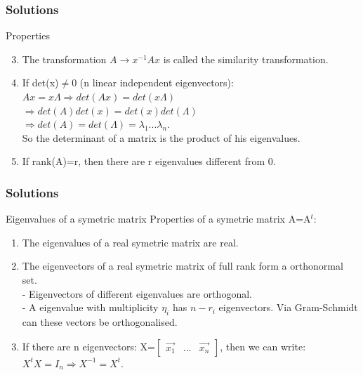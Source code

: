 \begin{frame}
	\frametitle{Solutions}
	\begin{block}{Properties}
		\begin{enumerate}
			\setcounter{enumi}{2}
			\item The transformation $A \rightarrow x^{-1}Ax$ is called the similarity transformation.
			\item If det(x)$\neq$0 (n linear independent eigenvectors): \\
			$Ax=x\Lambda \Rightarrow det(Ax)=det(x\Lambda)$\\
			$\Rightarrow det(A)det(x)=det(x)det(\Lambda)$\\ 
			$\Rightarrow det(A) = det(\Lambda)=\lambda_1...\lambda_n$. \\
			So the determinant of a matrix is the product of his eigenvalues. 
			\item If rank(A)=r, then there are r eigenvalues different from 0.
		\end{enumerate}
	\end{block}
\end{frame}

\begin{frame}
	\frametitle{Solutions}
	\begin{block}{Eigenvalues of a symetric matrix}
		Properties of a symetric matrix A=A$^t$:
		\begin{enumerate}
			\item The eigenvalues of a real symetric matrix are real.
			\item The eigenvectors of a real symetric matrix of full rank form a orthonormal set.\\
			- Eigenvectors of different eigenvalues are orthogonal.\\
			- A eigenvalue with multiplicity $\eta_i$ has $n-r_i$ eigenvectors. Via Gram-Schmidt can these vectors be orthogonalised.
			\item If there are n eigenvectors: X=$\begin{bmatrix}
			\overrightarrow{x_1}& ... & \overrightarrow{x_n}
			\end{bmatrix}$, then we can write: $X^tX=I_n \Rightarrow X^{-1}=X^t$.
		\end{enumerate}
	\end{block}
\end{frame}

